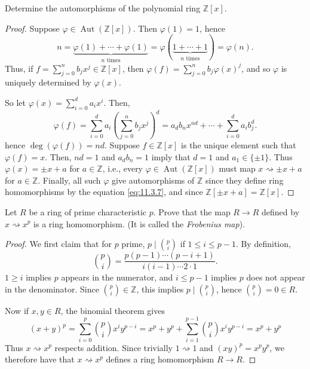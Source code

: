 \documentclass[12pt]{article}
\theoremstyle{remark}
\DeclareMathOperator{\Aut}{Aut}
\begin{document}
\setcounter{subsubsection}{6}
\begin{problem}
  Determine the automorphisms of the polynomial ring $\mathbb{Z}[x]$.
\end{problem}
\begin{proof}
  Suppose $\varphi \in \Aut(\mathbb{Z}[x])$. Then $\varphi(1) = 1$, hence
  \begin{equation*}
    n = \underbrace{\varphi(1) + \cdots + \varphi(1)}_{\text{$n$ times}} = \varphi(\underbrace{1 + \cdots + 1}_{\text{$n$ times}}) = \varphi(n).
  \end{equation*}
  Thus, if $f = \sum_{j=0}^n b_jx^j \in \mathbb{Z}[x]$, then $\varphi(f) = \sum_{j=0}^n b_j\varphi(x)^j$, and so $\varphi$ is uniquely determined by $\varphi(x)$.
  \par So let $\varphi(x) = \sum_{i=0}^d a_ix^i$. Then,
  \begin{equation}\label{eq:11.3.7}
    \varphi(f) = \sum_{i=0}^d a_i\left( \sum_{j=0}^n b_jx^j \right)^d = a_db_nx^{nd} + \cdots + \sum_{i=0}^d a_ib_j^d.
  \end{equation}
  hence $\deg(\varphi(f)) = nd$. Suppose $f \in \mathbb{Z}[x]$ is the unique element such that $\varphi(f) = x$. Then, $nd=1$ and $a_db_n = 1$ imply that $d=1$ and $a_1 \in \{\pm1\}$. Thus $\varphi(x) = \pm x + a$ for $a \in \mathbb{Z}$, i.e., every $\varphi \in \Aut(\mathbb{Z}[x])$ must map $x \rightsquigarrow \pm x + a$ for $a \in \mathbb{Z}$. Finally, all such $\varphi$ give automorphisms of $\mathbb{Z}$ since they define ring homomorphisms by the equation \eqref{eq:11.3.7}, and since $\mathbb{Z}[\pm x + a] = \mathbb{Z}[x]$.
\end{proof}

\begin{problem}\label{exc:11.3.8}
  Let $R$ be a ring of prime characteristic $p$. Prove that the map $R \to R$ defined by $x \rightsquigarrow x^p$ is a ring homomorphism. (It is called the \emph{Frobenius map}).
\end{problem}
\begin{proof}
  We first claim that for $p$ prime, $p \mid \binom{p}{i}$ if $1 \le i \le p-1$. By definition,
  \begin{equation*}
    \binom{p}{i}= \frac{p(p-1)\cdots (p-i+1)}{i(i-1)\cdots 2\cdot 1}.
  \end{equation*}
  $1 \ge i$ implies $p$ appears in the numerator, and $i \le p-1$ implies $p$ does not appear in the denominator. Since $\binom{p}{i} \in \mathbb{Z}$, this implies $p \mid \binom{p}{i}$, hence $\binom{p}{i} = 0 \in R$.
  \par Now if $x,y \in R$, the binomial theorem gives
  \begin{equation*}
    (x+y)^p = \sum_{i=0}^p \binom{p}{i} x^i y^{p-i} = x^p + y^p + \sum_{i=1}^{p-1} \binom{p}{i}x^iy^{p-i} = x^p + y^p
  \end{equation*}
  Thus $x \rightsquigarrow x^p$ respects addition. Since trivially $1 \rightsquigarrow 1$ and $(xy)^p = x^py^p$, we therefore have that $x \rightsquigarrow x^p$ defines a ring homomorphism $R \to R$.
\end{proof}
\end{document}
